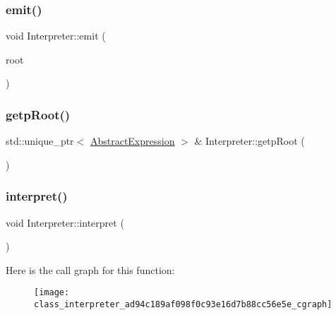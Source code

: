 \mbox{\label{class_interpreter_a5b56d30db52524f4417e99597c56bb8b}} 
\subsubsection{\texorpdfstring{emit()}{emit()}}
{\footnotesize\ttfamily void Interpreter\+::emit (\begin{DoxyParamCaption}\item[{std\+::unique\+\_\+ptr$<$ \mbox{\hyperlink{class_abstract_expression}{Abstract\+Expression}} $>$ \&}]{root }\end{DoxyParamCaption})}

\mbox{\label{class_interpreter_a507aaf5f8d77bfa29a05f442e7eff6a0}} 
\subsubsection{\texorpdfstring{getpRoot()}{getpRoot()}}
{\footnotesize\ttfamily std\+::unique\+\_\+ptr$<$ \mbox{\hyperlink{class_abstract_expression}{Abstract\+Expression}} $>$ \& Interpreter\+::getp\+Root (\begin{DoxyParamCaption}{ }\end{DoxyParamCaption})}

\mbox{\label{class_interpreter_ad94c189af098f0c93e16d7b88cc56e5e}} 
\subsubsection{\texorpdfstring{interpret()}{interpret()}}
{\footnotesize\ttfamily void Interpreter\+::interpret (\begin{DoxyParamCaption}{ }\end{DoxyParamCaption})}

Here is the call graph for this function\+:
\nopagebreak
\begin{figure}[H]
\begin{center}
\leavevmode
\texttt{[image: class\_interpreter\_ad94c189af098f0c93e16d7b88cc56e5e\_cgraph]}
\end{center}
\end{figure}


